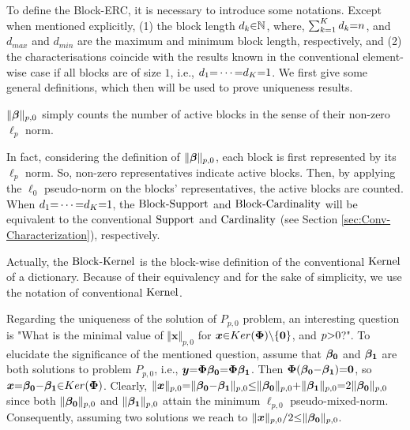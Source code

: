 To define the Block-ERC, it is necessary to introduce some notations.
Except when mentioned explicitly, (1) 
the block length $d_k {\in} \mathbb{N}$, where, $\sum_{k {=} 1}^K d_k {=} n$, and $d_{max}$ and $d_{min}$ are the maximum and minimum block length, respectively, and (2) the characterisations coincide with the results known in the conventional element-wise case if all blocks are of size $1$, i.e., $d_1 {=} \cdots {=} d_K {=} 1$.
We first give some general definitions, which then will be used to prove uniqueness results.


$\Vert \boldsymbol{\beta} \Vert_{p,0}$ simply counts the number of active blocks in the sense of their non-zero $\ell_{p}$ norm.

In fact, considering the definition of $\Vert \boldsymbol{\beta} \Vert_{p,0}$, each block is first represented by its $\ell_{p}$ norm.
So, non-zero representatives indicate active blocks.
Then, by applying the $\ell_{0}$ pseudo-norm on the blocks' representatives, 
the active blocks are counted.
When $d_1 {=} \cdots {=} d_K {=} 1$, the $\mathrm{Block\text{{-}}Support}$ and $\mathrm{Block\text{{-}}Cardinality}$ will be equivalent to the conventional $\mathrm{Support}$ and $\mathrm{Cardinality}$ (see Section \ref{sec:Conv-Characterization}), respectively.

Actually, the $\mathrm{Block\text{{-}}Kernel}$ is the block-wise definition of the conventional $\mathrm{Kernel}$ of a dictionary.
Because of their equivalency and for the sake of simplicity, we use the notation of conventional $\mathrm{Kernel}$.

Regarding the uniqueness of the solution of $P_{p,0}$ problem, an interesting question is 
"What is the minimal value of $\Vert \boldsymbol{x} \Vert_{p,0}$ for $\boldsymbol{x} {\in} Ker(\boldsymbol{\Phi}) \backslash\{\boldsymbol{0}\}$, and $p {>} 0$?".
To elucidate the significance of the mentioned question, assume that $\boldsymbol{\beta_0}$ and $\boldsymbol{\beta_1}$ are both solutions to problem $P_{p,0}$, i.e., $\boldsymbol{y} {=} \boldsymbol{\Phi} \boldsymbol{\beta_0} {=} \boldsymbol{\Phi} \boldsymbol{\beta_1}$.
Then $\boldsymbol{\Phi} (\boldsymbol{\beta_0} {-} \boldsymbol{\beta_1}) {=} \boldsymbol{0}$, so $\boldsymbol{x} {=} \boldsymbol{\beta_0} {-} \boldsymbol{\beta_1} {\in} Ker(\boldsymbol{\Phi})$. 
Clearly, $\Vert \boldsymbol{x} \Vert_{p,0} {=} \Vert \boldsymbol{\beta_0} {-} \boldsymbol{\beta_1} \Vert_{p,0} {\leq} \Vert \boldsymbol{\beta_0} \Vert_{p,0} {+} \Vert \boldsymbol{\beta_1} \Vert_{p,0} {=} 2 \Vert\boldsymbol{\beta_0} \Vert_{p,0}$ since both $\Vert \boldsymbol{\beta_0} \Vert_{p,0}$ and $\Vert \boldsymbol{\beta_1} \Vert_{p,0}$ attain the minimum $\ell_{p,0}$ pseudo-mixed-norm.
Consequently, assuming two solutions we reach to $\Vert \boldsymbol{x} \Vert_{p,0} / 2 {\leq} \Vert \boldsymbol{\beta_0} \Vert_{p,0}$. 

